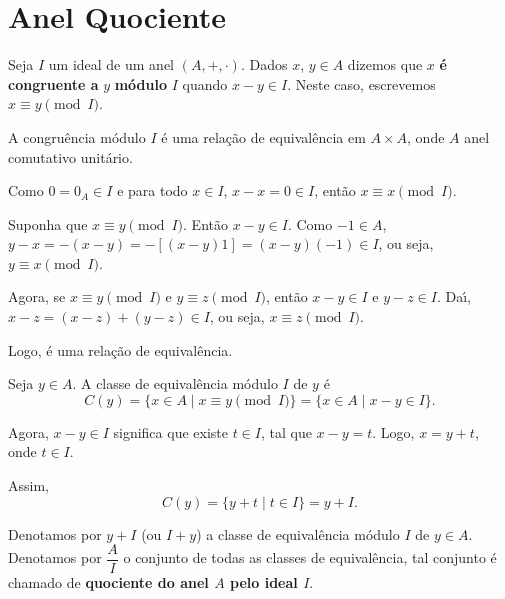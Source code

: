\section{Anel Quociente} %
\label{sec:anel_quociente}

\begin{definicao}
	Seja $I$ um ideal de um anel $(A, +, \cdot)$. Dados $x$, $y \in A$ dizemos que $x$ \textbf{\'e congruente a} $y$ \textbf{m\'odulo} $I$ quando $x-y \in I$. Neste caso, escrevemos $x\equiv y \pmod I$.
\end{definicao}

\begin{proposicao}
	A congru{\^e}ncia m{\'o}dulo $I$ {\'e} uma rela{\c c}{\~a}o de equival{\^e}ncia em $A \times A$, onde $A$ anel comutativo unit{\'a}rio.
\end{proposicao}
\begin{prova}
	Como $0 = 0_{A} \in I$ e para todo $x \in I$, $x - x = 0 \in I$, ent{\~a}o $x \equiv x \pmod I$.

	Suponha que $x\equiv y \pmod I$. Ent{\~a}o $x - y \in I$. Como $-1 \in A$, $y - x = -(x - y) = -[(x - y)1] = (x - y)(-1) \in I$, ou seja, $y\equiv x \pmod I$.

	Agora, se $x\equiv y \pmod I$ e $y\equiv z \pmod I$, ent{\~a}o $x - y \in I$ e $y - z \in I$. Da{\'\i}, $x - z = (x - z) + (y - z)\in I$, ou seja, $x\equiv z \pmod I$.

	Logo, {\'e} uma rela{\c c}{\~a}o de equival{\^e}ncia.
\end{prova}

Seja $y \in A$. A classe de equival{\^e}ncia m{\'o}dulo $I$ de $y$ {\'e}
\[
	C(y) = \{x \in A \mid x\equiv y \pmod I\} = \{x \in A \mid x - y \in I\}.
\]

Agora, $x - y \in I$ significa que existe $t \in I$, tal que $x - y = t$. Logo, $x = y + t$, onde $t \in I$.

Assim,
\[
	C(y) = \{y + t\mid t \in I\} = y + I.
\]

\begin{observacao}
	Denotamos por $y + I$ (ou $I + y$) a classe de equival{\^e}ncia m{\'o}dulo $I$ de $y \in A$. Denotamos por $\dfrac{A}{I}$ o conjunto de todas as classes de equival{\^e}ncia, tal conjunto {\'e} chamado de \textbf{quociente do anel $A$ pelo ideal $I$}.
\end{observacao}

